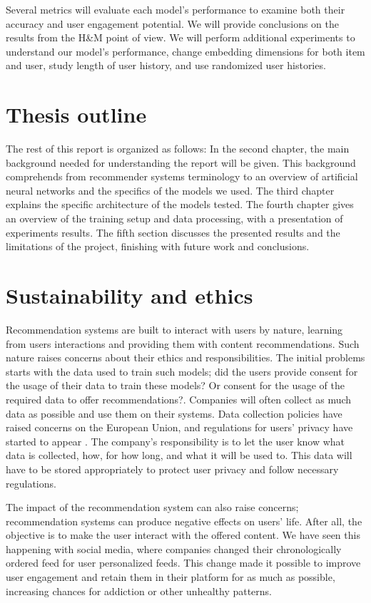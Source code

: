 \documentclass{tex_files/kththesis}
\begin{document}
Several metrics will evaluate each model's performance to examine both their accuracy and user engagement potential. We will provide conclusions on the results from the H\&M point of view. We will perform additional experiments to understand our model's performance, change embedding dimensions for both item and user, study length of user history, and use randomized user histories.

\section{Thesis outline}
The rest of this report is organized as follows: In the second chapter, the main background needed for understanding the report will be given. This background comprehends from recommender systems terminology to an overview of artificial neural networks and the specifics of the models we used. The third chapter explains the specific architecture of the models tested. The fourth chapter gives an overview of the training setup and data processing, with a presentation of experiments results. The fifth section discusses the presented results and the limitations of the project, finishing with future work and conclusions.

\section{Sustainability and ethics}
Recommendation systems are built to interact with users by nature, learning from users interactions and providing them with content recommendations. Such nature raises concerns about their ethics and responsibilities. The initial problems starts with the data used to train such models; did the users provide consent for the usage of their data to train these models? Or consent for the usage of the required data to offer recommendations?. Companies will often collect as much data as possible and use them on their systems. Data collection policies have raised concerns on the European Union, and regulations for users' privacy have started to appear \cite{EUdataregulations2018}. The company's responsibility is to let the user know what data is collected, how, for how long, and what it will be used to. This data will have to be stored appropriately to protect user privacy and follow necessary regulations.

The impact of the recommendation system can also raise concerns; recommendation systems can produce negative effects on users' life. After all, the objective is to make the user interact with the offered content. We have seen this happening with social media, where companies changed their chronologically ordered feed for user personalized feeds. This change made it possible to improve user engagement and retain them in their platform for as much as possible, increasing chances for addiction or other unhealthy patterns.
\end{document}
